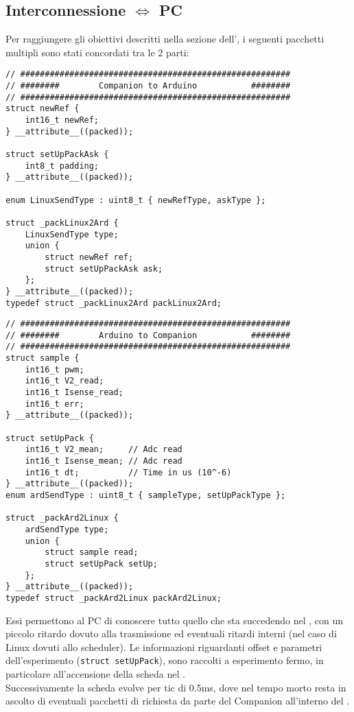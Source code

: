 \newpage
\subsection{Interconnessione \microC $\Leftrightarrow$ PC}
Per raggiungere gli obiettivi descritti nella sezione dell', i seguenti pacchetti multipli sono stati concordati tra le 2 parti:
\begin{lstlisting}[style=cppStyle,caption={Pacchetti PC $\Rightarrow$ \microC},label=lst:Companion2ArdPack]
// #######################################################
// ########        Companion to Arduino           ########
// #######################################################
struct newRef {
	int16_t newRef;
} __attribute__((packed));

struct setUpPackAsk {
	int8_t padding;
} __attribute__((packed));

enum LinuxSendType : uint8_t { newRefType, askType };

struct _packLinux2Ard {
	LinuxSendType type;
	union {
		struct newRef ref;
		struct setUpPackAsk ask;
	};
} __attribute__((packed));
typedef struct _packLinux2Ard packLinux2Ard;
\end{lstlisting}

\begin{lstlisting}[style=cppStyle,caption={Pacchetti \microC$\Rightarrow$ PC },label=lst:Ard2CompanionPack] 
// #######################################################
// ########        Arduino to Companion           ########
// #######################################################
struct sample {
	int16_t pwm;
	int16_t V2_read;
	int16_t Isense_read;
	int16_t err;
} __attribute__((packed));

struct setUpPack {
	int16_t V2_mean;     // Adc read
	int16_t Isense_mean; // Adc read
	int16_t dt;          // Time in us (10^-6)
} __attribute__((packed));
enum ardSendType : uint8_t { sampleType, setUpPackType };

struct _packArd2Linux {
	ardSendType type;
	union {
		struct sample read;
		struct setUpPack setUp;
	};
} __attribute__((packed));
typedef struct _packArd2Linux packArd2Linux;
\end{lstlisting}
\noindent
Essi permettono al PC di conoscere tutto quello che sta succedendo nel \microC, con un piccolo ritardo dovuto alla trasmissione ed eventuali ritardi interni (nel caso di Linux dovuti allo scheduler).
Le informazioni riguardanti offset e parametri dell'esperimento (\verb|struct setUpPack|), sono raccolti a esperimento fermo, in particolare all'accensione della scheda nel .\\
Successivamente la scheda evolve per tic di 0.5ms, dove nel tempo morto resta in ascolto di eventuali pacchetti di richiesta da parte del Companion all'interno del .

